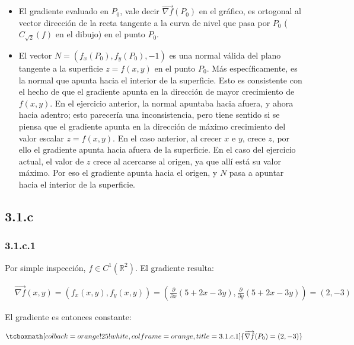 \documentclass{article}
\renewcommand{\Bbb}{\mathbb}
\begin{document}
\begin{itemize}
\item El gradiente evaluado en $P_0$, vale decir $\overrightarrow{ \nabla f}(P_0)$ en el gráfico, es ortogonal al vector dirección de la recta tangente a la curva de nivel que pasa por $P_0$ ($C_{\sqrt{2}}(f)$ en el dibujo) en el punto $P_0$.
\item El vector $N = (f_x(P_0), f_y(P_0), -1)$ es una normal válida del plano tangente a la superficie $z = f(x,y)$ en el punto $P_0$. Más específicamente, es la normal que apunta hacia el interior de la superficie. Esto es consistente con el hecho de que el gradiente apunta en la dirección de mayor crecimiento de $f(x,y)$. En el ejercicio anterior, la normal apuntaba hacia afuera, y ahora hacia adentro; esto parecería una inconsistencia, pero tiene sentido si se piensa que el gradiente apunta en la dirección de máximo crecimiento del valor escalar $z = f(x,y)$. En el caso anterior, al crecer $x$ e $y$, crece $z$, por ello el gradiente apunta hacia afuera de la superficie. En el caso del ejercicio actual, el valor de $z$ crece al acercarse al origen, ya que allí está su valor máximo. Por eso el gradiente apunta hacia el origen, y $N$ pasa a apuntar hacia el interior de la superficie.
\end{itemize}

\subsection*{3.1.c}
\label{subsec:3.1.c}

\subsubsection*{3.1.c.1}
\label{subsubsec:3.1.c.1}

Por simple inspección, $f \in C^1(\Bbb R^2)$. El gradiente resulta:

\begin{align}
& \overrightarrow{ \nabla f }(x,y) = (f_x(x,y), f_y(x,y)) = \left( \frac{\partial}{\partial x}(5 +2x -3y), \frac{\partial}{\partial y}(5 +2x -3y) \right) = (2,-3)
\end{align}
 
El gradiente es entonces constante:

\begin{equation}
\tcboxmath[colback=orange!25!white,colframe=orange,title=3.1.c.1]
{
\overrightarrow{ \nabla f }(P_0) = (2, -3)
}
\end{equation}
\end{document}
